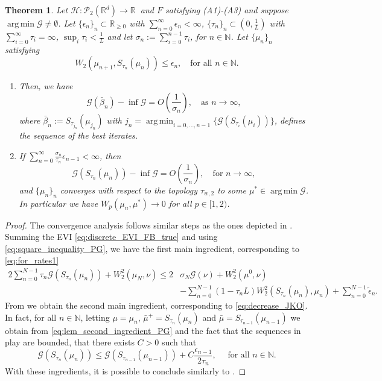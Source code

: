 \documentclass[11pt]{article}
\DeclareMathOperator*{\argmin}{arg\,min}
\newtheorem{theorem}{Theorem}[section]
\newcommand{\cP}{\mathcal{P}}
\newcommand{\cG}{\mathcal{G}}
\newcommand{\cT}{S}
\newcommand{\R}{\mathbb{R}}
\newcommand{\N}{\mathbb{N}}
\numberwithin{equation}{section}
\begin{document}
\begin{theorem}\label{thm:PG_convergence1}
	Let $\mathcal{H} : \cP_2(\R^d) \to \mathbb{R} \ $ and $F$ satisfying (A1)-(A3) and suppose $\argmin \cG \neq \emptyset$. Let $\{\epsilon_n\}_n\subset \mathbb{R}_{\geq 0}$ with $\sum_{n=0}^{\infty} \epsilon_n < \infty$, $\{\tau_n\}_n \subset \left(0,\frac{1}{L}\right)$ with $\sum_{i=0}^{\infty}\tau_i= \infty$, $\sup_i \tau_i < \frac{1}{L}$ and let $\sigma_n:= \sum_{i=0}^{n-1}\tau_i$, for $n\in\mathbb{N}$. Let $\{\mu_n\}_n$ satisfying
	\[W_2(\mu_{n+1},\cT_{\tau_n}(\mu_n))\leq \epsilon_n, \quad \text{for all } n \in \N.\]
	\begin{enumerate}
		\item Then, we have
		\begin{equation}\label{eq:rate_PG_bar1}
			\cG(\bar \beta_n)-\inf \cG = O\left(\frac{1}{\sigma_n}\right), \quad \text{as } n\to \infty,
		\end{equation}
		where $\bar \beta_n := \cT_{\tau_{j_n}}(\mu_{j_n})$ with $j_n = \argmin_{i=0,\dots,n-1}\{\cG(\cT_{\tau_i}(\mu_i))\}$, defines the sequence of the best iterates.
		\item If $\sum_{n=0}^{\infty}\frac{\sigma_n}{\tau_n}\epsilon_{n-1}  < \infty$, then \[\cG(\cT_{\tau_n}(\mu_n))-\inf \cG = O\left(\frac{1}{\sigma_n}\right), \quad \text{for } n\to \infty,\] and $\{\mu_n\}_n$ converges with respect to the topology $\tau_{w,2}$ to some $\mu^*\in \argmin \cG$. In particular we have $W_p(\mu_n,\mu^*)\to 0$ for all $p\in[1,2)$.
	\end{enumerate}
\end{theorem}
\begin{proof}
	The convergence analysis follows similar steps as the ones depicted in . Summing the EVI \eqref{eq:discrete_EVI_FB_true} and using \eqref{eq:square_inequality_PG}, we have the first main ingredient, corresponding to \eqref{eq:for_rates1}
	\begin{equation}\label{eq:for_rates1_PG}
		\begin{aligned}
			2\sum_{n=0}^{N-1}\tau_n\cG(\cT_{\tau_n}(\mu_n))+W_2^2(\mu_N,\nu)\leq 2&\sigma_N \cG(\nu)+W_2^2(\mu^0,\nu)\\
			&-\sum_{n=0}^{N-1}(1-\tau_n L)W_2^2(\cT_{\tau_n}(\mu_n),\mu_n)+\sum_{n=0}^{N-1}\tilde{\epsilon}_n.
		\end{aligned}
	\end{equation}
	From  we obtain the second main ingredient, corresponding to \eqref{eq:decrease_JKO}. In fact, for all $n\in \mathbb{N}$, letting $\mu=\mu_n$, $\bar \mu^+= \cT_{\tau_{n}}(\mu_{n})$ and $\bar \mu= \cT_{\tau_{n-1}}(\mu_{n-1})$ we obtain from \eqref{eq:lem_second_ingredient_PG} and the fact that the sequences in play are bounded, that there exists $C>0$ such that
	\begin{equation}
		\mathcal{G}(\cT_{\tau_{n}}(\mu_{n})) \leq \mathcal{G}(\cT_{\tau_{n-1}}(\mu_{n-1})) +  C\frac{\epsilon_{n-1}}{2\tau_n}, \quad \text{ for all } n \in \N.
	\end{equation}
	With these ingredients, it is possible to conclude similarly to .
\end{proof}
\end{document}
